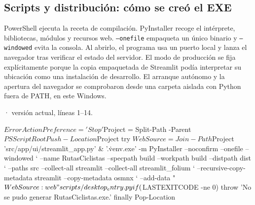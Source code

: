 \documentclass[11pt,a4paper]{article}
\begin{document}
\subsection{Scripts y distribución: cómo se creó el EXE}
PowerShell ejecuta la receta de compilación. PyInstaller recoge el intérprete, bibliotecas, módulos y recursos web. \texttt{--onefile} empaqueta un único binario y \texttt{--windowed} evita la consola. Al abrirlo, el programa usa un puerto local y lanza el navegador tras verificar el estado del servidor. El modo de producción se fija explícitamente porque la copia empaquetada de Streamlit podía interpretar su ubicación como una instalación de desarrollo. El arranque autónomo y la apertura del navegador se comprobaron desde una carpeta aislada con Python fuera de PATH, en este Windows.

\smallskip
{\footnotesize\texttt{} · versión actual, líneas 1--14.}\par
\begin{Codigo}[firstnumber=1]
$ErrorActionPreference = 'Stop'
$Project = Split-Path -Parent $PSScriptRoot
Push-Location $Project
try {
    $WebSource = Join-Path $Project 'src/app/ui/streamlit_app.py'
    & '.\.venv\Scripts\python.exe' -m PyInstaller --noconfirm --onefile --windowed `
        --name RutasCiclistas --specpath build --workpath build --distpath dist `
        --paths src --collect-all streamlit --collect-all streamlit_folium `
        --recursive-copy-metadata streamlit --copy-metadata osmnx `
        --add-data "${WebSource}:web" scripts/desktop_entry.py
    if ($LASTEXITCODE -ne 0) { throw 'No se pudo generar RutasCiclistas.exe.' }
} finally {
    Pop-Location
}
\end{Codigo}
\end{document}
